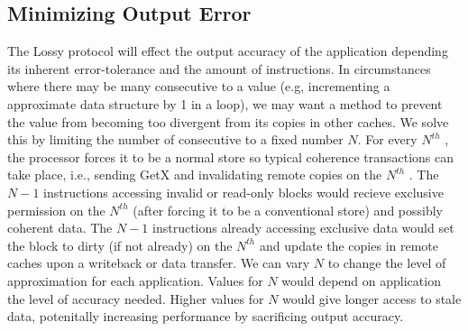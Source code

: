 \subsection{Minimizing Output Error}


The Lossy protocol will effect the output accuracy of the application depending its inherent error-tolerance and the amount of \storea instructions. In circumstances where there may be many consecutive \storea to a value (e.g, incrementing a approximate data structure by 1 in a loop), we may want a method to prevent the value from becoming too divergent from its copies in other caches. We solve this by limiting the number of consecutive \storea to a fixed number $N$. For every $N^{th}$ \storea, the processor forces it to be a normal store so typical coherence transactions can take place, i.e., sending GetX and invalidating remote copies on the $N^{th}$ \storea. The $N-1$ \storea instructions accessing invalid or read-only blocks would recieve exclusive permission on the $N^{th}$ \storea (after forcing it to be a conventional store) and possibly coherent data. The $N-1$ \storea instructions already accessing exclusive data would set the block to dirty (if not already) on the $N^{th}$ \storea and update the copies in remote caches upon a writeback or data transfer. We can vary $N$ to change the level of approximation for each application. Values for $N$ would depend on application the level of accuracy needed. Higher values for $N$ would give \storea longer access to stale data, potenitally increasing performance by sacrificing output accuracy.


